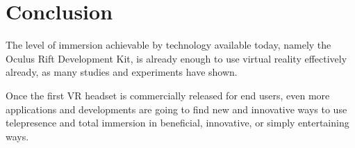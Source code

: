 \documentclass[11pt]{article}
\begin{document}
\section{Conclusion}
The level of immersion achievable by technology available today, namely the Oculus Rift Development Kit, is already enough to use virtual reality effectively already, as many studies and experiments have shown.

Once the first VR headset is commercially released for end users, even more applications and developments are going to find new and innovative ways to use telepresence and total immersion in beneficial, innovative, or simply entertaining ways.




\end{document}
